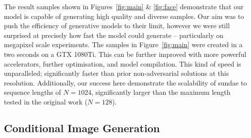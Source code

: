 The result samples shown in Figures~\ref{fig:main} \& \ref{fig:face} demonstrate
that our model is capable of generating high quality and diverse samples. Our
aim was to push the efficiency of generative models to their limit, however we
were still surprised at precisely how fast the model could generate --
particularly on megapixel scale experiments. The samples in
Figure~\ref{fig:main} were created in a two seconds on a GTX 1080Ti. This can be
further improved with more powerful accelerators, further optimisation, and
model compilation. This kind of speed is unparalleled; significantly faster than
prior non-adversarial solutions at this resolution. Additionally, our success
here demonstrate the scalability of \gls{sundae} to sequence lengths of
$N=1024$, significantly larger than the maximum length tested in the original
work ($N=128$).

\subsection{Conditional Image Generation}
\label{subsec:evaluationConditional}

